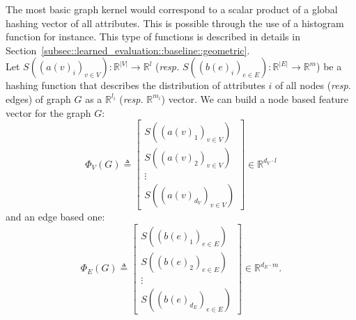                 The most basic graph kernel would correspond to a scalar product of a global hashing vector of all attributes.
                This is possible through the use of a histogram function for instance.
                This type of functions is described in details in Section~\ref{subsec::learned_evaluation::baseline::geometric}.\\

                Let $S\left(\left(a(v)_i\right)_{v\in V}\right): \mathbb{R}^{\vert V\vert} \rightarrow \mathbb{R}^l$ (\textit{resp.} $S\left(\left(b(e)_i\right)_{e\in E}\right): \mathbb{R}^{\vert E\vert} \rightarrow \mathbb{R}^{m}$) be a hashing function that describes the distribution of attributes $i$ of all nodes (\textit{resp.} edges) of graph $G$ as a $\mathbb{R}^{l_i}$ (\textit{resp.} $\mathbb{R}^{m_i}$) vector.
                We can build a node based feature vector for the graph $G$:
                \begin{equation}
                    \label{eq::feature_node_graph}
                    \Phi_V(G) \triangleq \begin{bmatrix}
                        S\left(\left(a(v)_1\right)_{v\in V}\right)\\
                        S\left(\left(a(v)_2\right)_{v\in V}\right)\\
                        \vdots\\
                        S\left(\left(a(v)_{d_V}\right)_{v\in V}\right)
                    \end{bmatrix} \in \mathbb{R}^{d_V \cdot l}
                \end{equation}
                and an edge based one:
                \begin{equation}
                    \label{eq::feature_edge_graph}
                    \Phi_E(G) \triangleq \begin{bmatrix}
                        S\left(\left(b(e)_1\right)_{e \in E}\right)\\
                        S\left(\left(b(e)_2\right)_{e \in E}\right)\\
                        \vdots\\
                        S\left(\left(b(e)_{d_E}\right)_{e \in E}\right)
                    \end{bmatrix} \in \mathbb{R}^{d_E \cdot m}.
                \end{equation}

